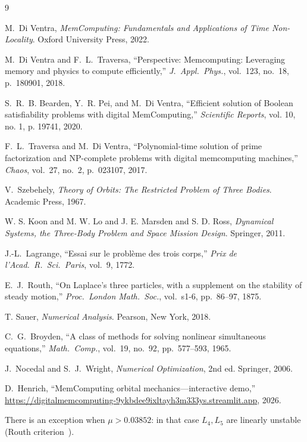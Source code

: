 \documentclass[aip,preprint,amsmath,amssymb,floatfix]{revtex4-2}
\begin{document}
\begin{thebibliography}{9}
\setlength{\itemsep}{2pt}

M.~Di Ventra, \textit{MemComputing: Fundamentals and Applications of Time
Non-Locality}. Oxford University Press, 2022.


M.~Di Ventra and F.~L.~Traversa, ``Perspective: Memcomputing: Leveraging memory
and physics to compute efficiently,'' \textit{J.~Appl.\ Phys.}, vol.~123,
no.~18, p.~180901, 2018.


S.~R.~B. Bearden, Y.~R. Pei, and M.~Di Ventra, ``Efficient solution of Boolean satisfiability problems with digital MemComputing,''
\textit{ Scientific Reports}, vol. 10, no. 1, p. 19741, 2020.

F.~L.~Traversa and M.~Di Ventra, ``Polynomial-time solution of prime
factorization and NP-complete problems with digital memcomputing machines,''
\textit{Chaos}, vol.~27, no.~2, p.~023107, 2017.

V.~Szebehely, \textit{Theory of Orbits: The Restricted Problem of Three Bodies}.
Academic Press, 1967.

 W. S. Koon and M. W. Lo and J. E. Marsden and S. D. Ross, \textit{Dynamical Systems, the Three-Body Problem and Space Mission Design}. 
 Springer, 2011.

J.-L.~Lagrange, ``Essai sur le probl\`eme des trois corps,'' \textit{Prix de
l'Acad.\ R.\ Sci.\ Paris}, vol.~9, 1772.

E.~J.~Routh, ``On Laplace's three particles, with a supplement on the stability
of steady motion,'' \textit{Proc.\ London Math.\ Soc.}, vol.~s1-6, pp.~86--97,
1875.

T. Sauer, \textit{Numerical Analysis}. Pearson, New York, 2018.

C.~G.~Broyden, ``A class of methods for solving nonlinear simultaneous
equations,'' \textit{Math.\ Comp.}, vol.~19, no.~92, pp.~577--593, 1965.

J.~Nocedal and S.~J.~Wright, \textit{Numerical Optimization}, 2nd ed.
Springer, 2006.

D.~Henrich, ``MemComputing orbital mechanics---interactive demo,''
\url{https://digitalmemcomputing-9ykbdee9ixltayh3m333ys.streamlit.app}, 2026.

There is an exception when $\mu>0.03852$: in that case $L_4,L_5$ are
linearly unstable (Routh criterion~\cite{routh1875}).

\end{thebibliography}
\end{document}
